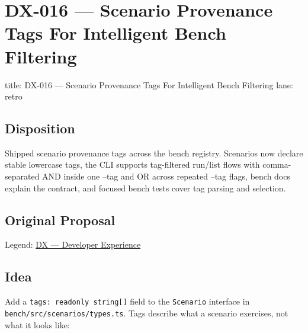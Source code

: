 \chapter{DX-016 --- Scenario Provenance Tags For Intelligent Bench Filtering}\label{record-323}

\smallskip

\begin{RecordMeta}
title: DX-016 — Scenario Provenance Tags For Intelligent Bench Filtering
lane: retro

\end{RecordMeta}

\section{Disposition}\label{record-323-disposition}

Shipped scenario provenance tags across the bench registry. Scenarios now declare stable lowercase tags, the CLI supports tag-filtered run/list flows with comma-separated AND inside one --tag and OR across repeated --tag flags, bench docs explain the contract, and focused bench tests cover tag parsing and selection.

\section{Original Proposal}\label{record-323-original-proposal}

Legend: \href{https://github.com/flyingrobots/bijou/blob/1853ad902f6bf219326409e7f743a5a1d6517dbc/docs/method/legends/DX-developer-experience.md}{DX --- Developer Experience}

\section{Idea}\label{record-323-idea}

Add a \texttt{t\allowbreak{}a\allowbreak{}g\allowbreak{}s\allowbreak{}:\allowbreak{} \allowbreak{}r\allowbreak{}e\allowbreak{}a\allowbreak{}d\allowbreak{}o\allowbreak{}n\allowbreak{}l\allowbreak{}y\allowbreak{} \allowbreak{}s\allowbreak{}t\allowbreak{}r\allowbreak{}i\allowbreak{}n\allowbreak{}g\allowbreak{}[\allowbreak{}]} field to the \texttt{S\allowbreak{}c\allowbreak{}e\allowbreak{}n\allowbreak{}a\allowbreak{}r\allowbreak{}i\allowbreak{}o} interface in \texttt{b\allowbreak{}e\allowbreak{}n\allowbreak{}c\allowbreak{}h\allowbreak{}/\allowbreak{}s\allowbreak{}r\allowbreak{}c\allowbreak{}/\allowbreak{}s\allowbreak{}c\allowbreak{}e\allowbreak{}n\allowbreak{}a\allowbreak{}r\allowbreak{}i\allowbreak{}o\allowbreak{}s\allowbreak{}/\allowbreak{}t\allowbreak{}y\allowbreak{}p\allowbreak{}e\allowbreak{}s\allowbreak{}.\allowbreak{}t\allowbreak{}s}. Tags describe what a scenario exercises, not what it looks like:

